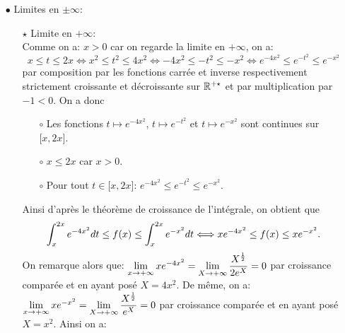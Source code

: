 \documentclass[a4paper, 11pt,reqno]{article}
\begin{document}
\begin{correction}
\begin{itemize}
		      \begin{center}
		      \end{center}
		\item[$\bullet$] Limites en $\pm\infty$:
		      \begin{itemize}
			      \item[$\star$] Limite en $+\infty$:\\
			            \noindent Comme on a: $x>0$ car on regarde la limite en $+\infty$, on a:
			            $$x\leq t\leq 2x\Leftrightarrow x^2\leq t^2\leq 4x^2\Leftrightarrow -4x^2\leq -t^2\leq -x^2\Leftrightarrow e^{-4x^2}\leq e^{-t^2}\leq e^{-x^2}$$
			            par composition par les fonctions carr\'ee et inverse respectivement strictement croissante et d\'ecroissante sur $\mathbb{R}^{+\star}$ et par multiplication par $-1<0$. On a donc
			            \begin{itemize}
				            \item[$\circ$] Les fonctions $t\mapsto e^{-4x^2}$, $t\mapsto e^{-t^2}$ et $t\mapsto e^{-x^2}$ sont continues sur $\lbrack x,2x\rbrack$.
				            \item[$\circ$] $x\leq 2x$ car $x>0$.
				            \item[$\circ$] Pour tout $t\in\lbrack x,2x\rbrack$: $e^{-4x^2}\leq e^{-t^2}\leq e^{-x^2}$.
			            \end{itemize}
			            Ainsi d'apr\`{e}s le th\'eor\`{e}me de croissance de l'int\'egrale, on obtient que
			            $$\displaystyle\int_x^{2x} e^{-4x^2}dt \leq f(x)\leq \displaystyle\int_x^{2x} e^{-x^2}dt
				            \Longleftrightarrow xe^{-4x^2} \leq f(x)\leq xe^{-x^2}.$$
			            On remarque alors que: $\lim\limits_{x\to +\infty} xe^{-4x^2}=\lim\limits_{X\to +\infty} \displaystyle\frac{X^{\frac{1}{2}}}{2e^X}=0$ par croissance compar\'ee et en ayant pos\'e $X=4x^2$. De m\^{e}me, on a: $\lim\limits_{x\to +\infty} xe^{-x^2}=\lim\limits_{X\to +\infty} \displaystyle\frac{X^{\frac{1}{2}}}{e^X}=0$ par croissance compar\'ee et en ayant pos\'e $X=x^2$. Ainsi on a:

\end{itemize}
\end{itemize}
\end{correction}
\end{document}
